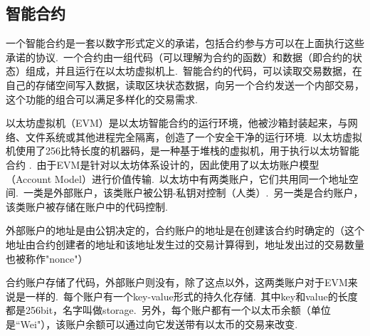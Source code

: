 \documentclass[a4paper,12pt,titlepage]{ctexart}
\begin{document}
\subsection{智能合约}
一个智能合约是一套以数字形式定义的承诺，包括合约参与方可以在上面执行这些承诺的协议.~一个合约由一组代码（可以理解为合约的函数）和数据（即合约的状态）组成，并且运行在以太坊虚拟机上.~智能合约的代码，可以读取交易数据，在自己的存储空间写入数据，读取区块状态数据，向另一个合约发送一个内部交易，这个功能的组合可以满足多样化的交易需求.~\par
以太坊虚拟机（EVM）是以太坊智能合约的运行环境，他被沙箱封装起来，与网络、文件系统或其他进程完全隔离，创造了一个安全干净的运行环境.~以太坊虚拟机使用了256比特长度的机器码，是一种基于堆栈的虚拟机，用于执行以太坊智能合约 .~由于EVM是针对以太坊体系设计的，因此使用了以太坊账户模型（Account Model）进行价值传输.~以太坊中有两类账户，它们共用同一个地址空间.~一类是外部账户，该类账户被公钥-私钥对控制（人类）.~另一类是合约账户，该类账户被存储在账户中的代码控制.~\par
外部账户的地址是由公钥决定的，合约账户的地址是在创建该合约时确定的（这个地址由合约创建者的地址和该地址发生过的交易计算得到，地址发出过的交易数量也被称作"nonce"）\par
合约账户存储了代码，外部账户则没有，除了这点以外，这两类账户对于EVM来说是一样的.~每个账户有一个key-value形式的持久化存储.~其中key和value的长度都是256bit，名字叫做storage.~另外，每个账户都有一个以太币余额（单位是“Wei"），该账户余额可以通过向它发送带有以太币的交易来改变.~
\end{document}
